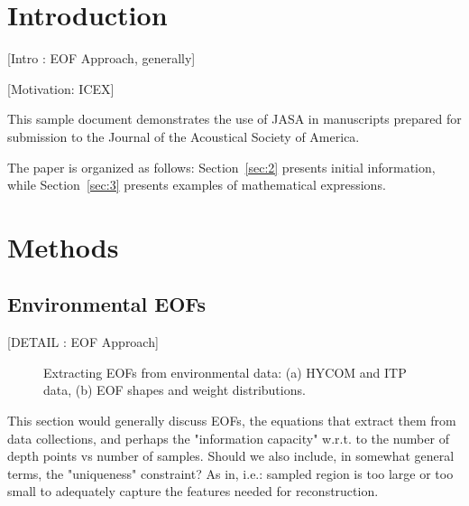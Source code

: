 \section{\label{sec:1} Introduction}

{\color{red}
[Intro : EOF Approach, generally]

[Motivation: ICEX]
}

This sample document demonstrates the use of JASA in manuscripts
prepared for submission to the Journal of the Acoustical Society of America.

The paper is organized as follows: Section~\ref{sec:2} presents
initial information, while
Section~\ref{sec:3} presents examples of mathematical expressions.



\section{\label{sec:2} Methods}

\subsection{\label{subsec:2:1} Environmental EOFs}

{\color{red}[DETAIL : EOF Approach]}

\begin{figure}[ht]

\caption{\label{fig:FIG1}{Extracting EOFs from environmental data: (a) HYCOM and ITP data, (b) EOF shapes and weight distributions.}}

\end{figure}

This section would generally discuss EOFs, the equations that extract them from data collections, and perhaps the "information capacity" w.r.t. to the number of depth points vs number of samples. Should we also include, in somewhat general terms, the "uniqueness" constraint? As in, i.e.: sampled region is too large or too small to adequately capture the features needed for reconstruction.



